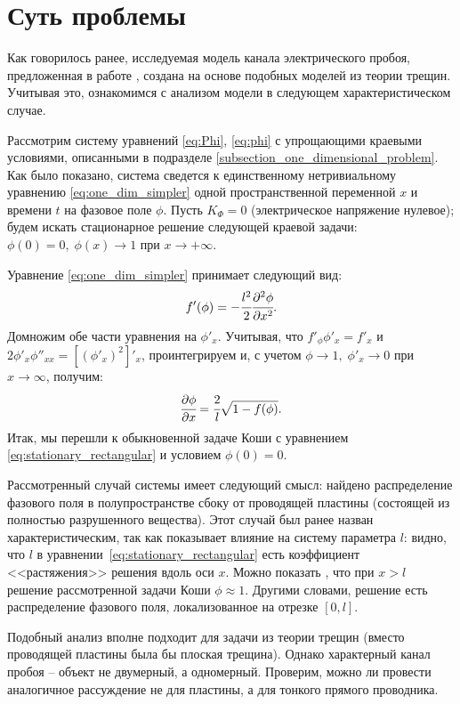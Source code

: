 
\section{Суть проблемы}

Как говорилось ранее, исследуемая модель канала электрического пробоя, предложенная в работе \cite{pitike_dielectric_breakdown}, создана на основе подобных моделей из теории трещин. Учитывая это, ознакомимся с анализом модели в следующем характеристическом случае.

Рассмотрим систему уравнений \eqref{eq:Phi}, \eqref{eq:phi} с упрощающими краевыми условиями, описанными в подразделе \ref{subsection_one_dimensional_problem}. Как было показано, система сведется к единственному нетривиальному уравнению \eqref{eq:one_dim_simpler} одной пространственной переменной $x$ и времени $t$ на фазовое поле $\phi$. Пусть $K_\Phi = 0$ (электрическое напряжение нулевое); будем искать стационарное решение следующей краевой задачи: $\phi(0) = 0, \; \phi(x) \to 1$ при $x \to +\infty$.

Уравнение \eqref{eq:one_dim_simpler} принимает следующий вид:
$$f'(\phi) = - \cfrac{l^2}{2} \cfrac{\partial^2 \phi}{\partial x^2} {\text{.}}$$
Домножим обе части уравнения на $\phi'_x$. Учитывая, что $f'_\phi \phi'_x = f'_x$ и $2 \phi'_x \phi''_{xx} = [(\phi'_x)^2]'_x$, проинтегрируем и, с учетом $\phi \to 1, \; \phi'_x \to 0$ при $x \to \infty$, получим:
\begin{equation}
    \cfrac{\partial \phi}{\partial x} = \cfrac{2}{l} \sqrt{1 - f(\phi)} {\text{.}}
    \label{eq:stationary_rectangular}
\end{equation}
Итак, мы перешли к обыкновенной задаче Коши с уравнением \eqref{eq:stationary_rectangular} и условием $\phi(0) = 0$.

Рассмотренный случай системы имеет следующий смысл: найдено распределение фазового поля в полупространстве сбоку от проводящей пластины (состоящей из полностью разрушенного вещества). Этот случай был ранее назван характеристическим, так как показывает влияние на систему параметра $l$: видно, что $l$ в уравнении~\eqref{eq:stationary_rectangular} есть коэффициент <<растяжения>> решения вдоль оси $x$. Можно показать \cite{zipunova_higher_codimension}, что при $x > l$ решение рассмотренной задачи Коши $\phi \approx 1$. Другими словами, решение есть распределение фазового поля, локализованное на отрезке $[0, l]$.

Подобный анализ вполне подходит для задачи из теории трещин (вместо проводящей пластины была бы плоская трещина). Однако характерный канал пробоя -- объект не двумерный, а одномерный. Проверим, можно ли провести аналогичное рассуждение не для пластины, а для тонкого прямого проводника.

